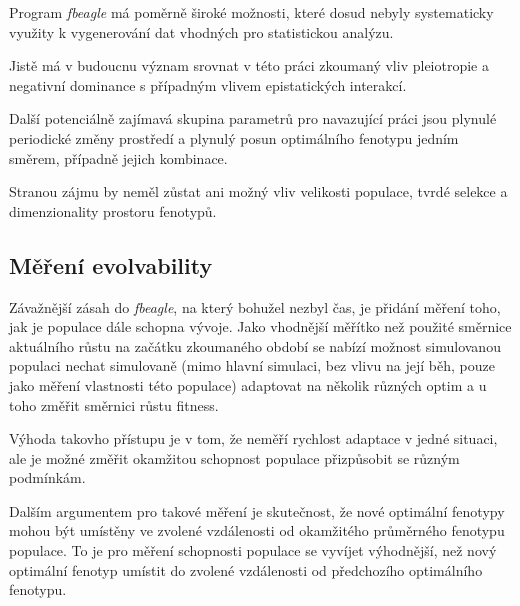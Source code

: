 Program \textit{fbeagle} má poměrně široké možnosti, které dosud nebyly systematicky využity k
vygenerování dat vhodných pro statistickou analýzu.

Jistě má v budoucnu význam srovnat v této práci zkoumaný vliv pleiotropie a negativní dominance s případným vlivem
epistatických interakcí.

Další potenciálně zajímavá skupina parametrů pro navazující práci jsou plynulé periodické změny prostředí
a plynulý posun optimálního fenotypu jedním směrem, případně jejich kombinace.

Stranou zájmu by neměl zůstat ani možný vliv velikosti populace, tvrdé selekce a dimenzionality prostoru fenotypů.

\subsection{Měření evolvability}

Závažnější zásah do \textit{fbeagle}, na který bohužel nezbyl čas, je přidání měření toho, jak je populace
dále schopna vývoje. Jako vhodnější měřítko než použité směrnice aktuálního růstu na začátku zkoumaného období
se nabízí možnost simulovanou populaci nechat simulovaně (mimo hlavní simulaci, bez vlivu na její běh,
pouze jako měření vlastnosti této populace) adaptovat na několik různých optim a u toho změřit směrnici
růstu fitness.

Výhoda takovho přístupu je v tom, že neměří rychlost adaptace v jedné situaci, ale je možné změřit okamžitou schopnost
populace přizpůsobit se různým podmínkám.

Dalším argumentem pro takové měření je skutečnost, že nové optimální fenotypy mohou být umístěny ve zvolené vzdálenosti
od okamžitého průměrného fenotypu populace. To je pro měření schopnosti populace se vyvíjet výhodnější, než nový
optimální fenotyp umístit do zvolené vzdálenosti od předchozího optimálního fenotypu.
